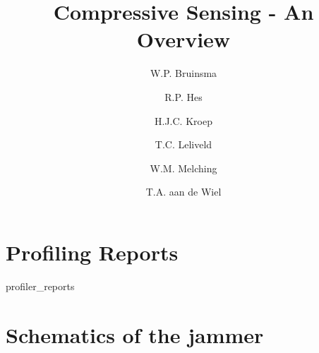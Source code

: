 \documentclass[a4paper, openany, oneside]{memoir}
\title{Compressive Sensing - An Overview}
\author{W.P. Bruinsma \and R.P. Hes \and H.J.C. Kroep \and T.C. Leliveld \and W.M. Melching \and T.A. aan de Wiel}
\begin{document}
\appendix

\chapter{Profiling Reports}
\label{ap:prof}
{profiler_reports}

\chapter{Schematics of the jammer}

\end{document}
